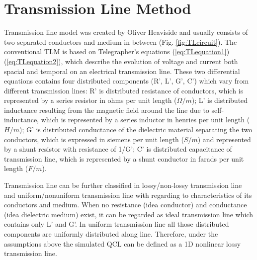 \documentclass[11pt,final]{scrbook}
\begin{document}
\section{Transmission Line Method}
Transmission line model was created by Oliver Heaviside \cite{heaviside2008electromagnetic} and usually consists of two separated conductors and medium in between (Fig. \ref{fig:TLcircuit}). The conventional TLM is based on Telegrapher's equations (\ref{eq:TLequation1})(\ref{eq:TLequation2}), which describe the evolution of voltage and current both spacial and temporal on an electrical transmission line. These two differential equations contains four distributed components (R', L', G', C') which vary from different transmission lines: R' is distributed resistance of conductors, which is represented by a series resistor in ohms per unit length ($\Omega /m$); L' is distributed inductance resulting from the magnetic field around the line due to self-inductance, which is represented by a series inductor in henries per unit length ($H/m$); G' is distributed conductance of the dielectric material separating the two conductors, which is expressed in siemens per unit length ($S/m$) and represented by a shunt resistor with resistance of 1/G'; C' is distributed capacitance of transmission line, which is represented by a shunt conductor in farads per unit length ($F/m$).

Transmission line can be further classified in lossy/non-lossy transmission line and uniform/nonuniform transmission line with regarding to characteristics of its conductors and medium. When no resistance (idea conductor) and conductance (idea dielectric medium) exist, it can be regarded as ideal transmission line which contains only L' and G'. In uniform transmission line all those distributed components are uniformly distributed along line. Therefore, under the assumptions above the simulated QCL can be defined as a 1D nonlinear lossy transmission line.\\
\end{document}
